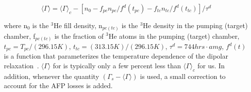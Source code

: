 \begin{equation}
\langle \Gamma\rangle=\langle \Gamma\rangle_{c}-[n_{0}-f_{pc}n_{pc}/f^{d}(t_{pc})- f_{tc}n_{tc}/f^{d}(t_{tc})]/\tau^{d}
\end{equation}

where n$_{0}$ is the $^{3}$He fill density, n$_{pc(tc)}$ is the $^{3}$He density in the pumping (target) chamber, f$_{pc(tc)}$ is the fraction of $^{3}$He atoms in the pumping (target) chamber, $t_{pc}=T_{pc}/(296.15 K)$, $t_{tc}=(313.15 K)/(296.15 K)$, $\tau^{d}=744 hrs\cdot amg$, $f^{d}(t)$ is a function that parameterizes the temperature dependence of the dipolar relaxation~\cite{JaideepThesis}. $\langle \Gamma\rangle$ for is typically only a few percent less than $\langle \Gamma\rangle_{c}$ for us. In addition, whenever the quantity $(\Gamma_{s}-\langle \Gamma\rangle)$ is used, a small correction to account for the AFP losses is added.












